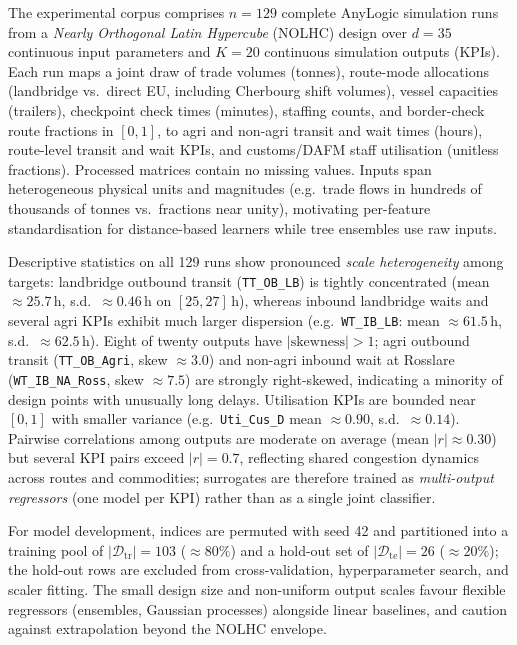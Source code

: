 \documentclass[12pt,twocolumn,a4paper]{article}
\theoremstyle{plain}
\theoremstyle{definition}
\theoremstyle{remark}
\newcommand{\train}{\mathcal{D}_{\mathrm{tr}}}
\newcommand{\test}{\mathcal{D}_{\mathrm{te}}}
\begin{document}
The experimental corpus comprises $n{=}129$ complete AnyLogic simulation runs from a \emph{Nearly Orthogonal Latin Hypercube} (NOLHC) design over $d{=}35$ continuous input parameters and $K{=}20$ continuous simulation outputs (KPIs).
Each run maps a joint draw of trade volumes (tonnes), route-mode allocations (landbridge vs.\ direct EU, including Cherbourg shift volumes), vessel capacities (trailers), checkpoint check times (minutes), staffing counts, and border-check route fractions in $[0,1]$, to agri and non-agri transit and wait times (hours), route-level transit and wait KPIs, and customs/DAFM staff utilisation (unitless fractions).
Processed matrices contain no missing values.
Inputs span heterogeneous physical units and magnitudes (e.g.\ trade flows in hundreds of thousands of tonnes vs.\ fractions near unity), motivating per-feature standardisation for distance-based learners while tree ensembles use raw inputs.

Descriptive statistics on all 129 runs show pronounced \emph{scale heterogeneity} among targets: landbridge outbound transit (\texttt{TT\_OB\_LB}) is tightly concentrated (mean ${\approx}25.7$\,h, s.d.\ ${\approx}0.46$\,h on $[25,27]$\,h), whereas inbound landbridge waits and several agri KPIs exhibit much larger dispersion (e.g.\ \texttt{WT\_IB\_LB}: mean ${\approx}61.5$\,h, s.d.\ ${\approx}62.5$\,h).
Eight of twenty outputs have $|\mathrm{skewness}|{>}1$; agri outbound transit (\texttt{TT\_OB\_Agri}, skew ${\approx}3.0$) and non-agri inbound wait at Rosslare (\texttt{WT\_IB\_NA\_Ross}, skew ${\approx}7.5$) are strongly right-skewed, indicating a minority of design points with unusually long delays.
Utilisation KPIs are bounded near $[0,1]$ with smaller variance (e.g.\ \texttt{Uti\_Cus\_D} mean ${\approx}0.90$, s.d.\ ${\approx}0.14$).
Pairwise correlations among outputs are moderate on average (mean $|r|{\approx}0.30$) but several KPI pairs exceed $|r|{=}0.7$, reflecting shared congestion dynamics across routes and commodities; surrogates are therefore trained as \emph{multi-output regressors} (one model per KPI) rather than as a single joint classifier.

For model development, indices are permuted with seed 42 and partitioned into a training pool of $|\train|{=}103$ (${\approx}80\%$) and a hold-out set of $|\test|{=}26$ (${\approx}20\%$); the hold-out rows are excluded from cross-validation, hyperparameter search, and scaler fitting.
The small design size and non-uniform output scales favour flexible regressors (ensembles, Gaussian processes) alongside linear baselines, and caution against extrapolation beyond the NOLHC envelope.
\end{document}
